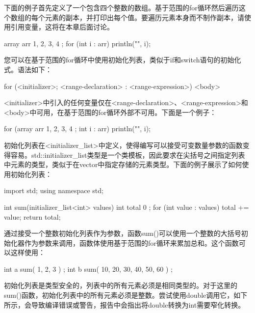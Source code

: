 下面的例子首先定义了一个包含四个整数的数组。基于范围的for循环然后遍历这个数组的每个元素的副本，并打印出每个值。要遍历元素本身而不制作副本，请使用引用变量，这将在本章后面讨论。

\begin{cpp}
array arr { 1, 2, 3, 4 };
for (int i : arr) { println("{}", i); }
\end{cpp}


您可以在基于范围的for循环中使用初始化列表，类似于if和switch语句的初始化式。语法如下：

\begin{cpp}
for (<initializer>; <range-declaration> : <range-expression>) { <body> }
\end{cpp}

<initializer>中引入的任何变量仅在<range-declaration>、<range-expression>和<body>中可用，在基于范围的for循环外部不可用。下面是一个例子：

\begin{cpp}
for (array arr { 1, 2, 3, 4 }; int i : arr) { println("{}", i); }
\end{cpp}


初始化列表在<initializer\_list>中定义，使得编写可以接受可变数量参数的函数变得容易。std::initializer\_list类型是一个类模板，因此要求在尖括号之间指定列表中元素的类型，类似于在vector中指定存储的元素类型。下面的例子展示了如何使用初始化列表：

\begin{cpp}
import std;
using namespace std;

int sum(initializer_list<int> values)
{
    int total { 0 };
    for (int value : values) {
        total += value;
    }
    return total;
}
\end{cpp}

通过接受一个整数初始化列表作为参数，函数sum()可以使用一个整数的大括号初始化器作为参数来调用，函数体使用基于范围的for循环来累加总和。这个函数可以这样使用：

\begin{cpp}
int a { sum({ 1, 2, 3 }) };
int b { sum({ 10, 20, 30, 40, 50, 60 }) };
\end{cpp}

初始化列表是类型安全的，列表中的所有元素必须是相同类型的。对于这里的sum()函数，初始化列表中的所有元素必须是整数。尝试使用double调用它，如下所示，会导致编译错误或警告，报告中会指出将double转换为int需要窄化转换。

